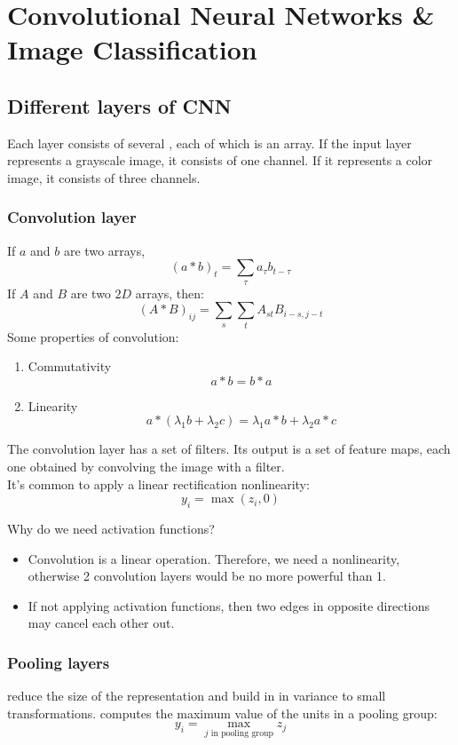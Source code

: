 \documentclass[11pt]{article}
\begin{document}
\section{Convolutional Neural Networks \& Image Classification}
\subsection{Different layers of CNN}
Each layer consists of several , each of which is an array. If the input layer represents a grayscale image, it consists of one channel. If it represents a color image, it consists of three channels.
\subsubsection{Convolution layer}
If $a$ and $b$ are two arrays,
$$(a * b)_t = \sum_{\tau} a_{\tau}b_{t-\tau}$$
If $A$ and $B$ are two $2D$ arrays, then:
$$(A * B)_{ij} = \sum_s\sum_t A_{st}B_{i-s,j-t}$$
\property
Some properties of convolution:
\begin{enumerate}
	\item Commutativity $$a * b = b * a$$
	\item Linearity $$a * (\lambda_1 b + \lambda_2 c) = \lambda_1 a * b + \lambda_2 a * c$$
\end{enumerate}
The convolution layer has a set of filters. Its output is a set of feature maps, each one obtained by convolving the image with a filter.\\
It's common to apply a linear rectification nonlinearity: $$y_i = \max(z_i, 0)$$

\remark
Why do we need activation functions?
\begin{itemize}
	\item Convolution is a linear operation. Therefore, we need a nonlinearity, otherwise 2 convolution layers would be no more powerful than 1.
	\item If not applying activation functions, then two edges in opposite directions may cancel each other out.
\end{itemize}
\subsubsection{Pooling layers}
 reduce the size of the representation and build in in variance to small transformations.
 computes the maximum value of the units in a pooling group:
$$y_i = \underset{\text{$j$ in pooling group}}{\max} z_j$$
\end{document}
